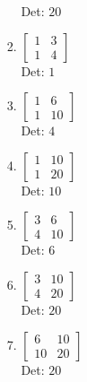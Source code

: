 \documentclass[12pt]{article}
\begin{document}
\begin{enumerate}
\begin{enumerate}
\begin{enumerate}
Det: $20$\\


\item $\displaystyle \left[\begin{matrix}1 & 3\\1 & 4\end{matrix}\right]$\\

Det: $1$\\


\item $\displaystyle \left[\begin{matrix}1 & 6\\1 & 10\end{matrix}\right]$\\

Det: $4$\\


\item $\displaystyle \left[\begin{matrix}1 & 10\\1 & 20\end{matrix}\right]$\\

Det: $10$\\


\item $\displaystyle \left[\begin{matrix}3 & 6\\4 & 10\end{matrix}\right]$\\

Det: $6$\\


\item $\displaystyle \left[\begin{matrix}3 & 10\\4 & 20\end{matrix}\right]$\\

Det: $20$\\


\item $\displaystyle \left[\begin{matrix}6 & 10\\10 & 20\end{matrix}\right]$\\

Det: $20$\\

\end{enumerate}


\end{enumerate}
\end{enumerate}
\end{document}
